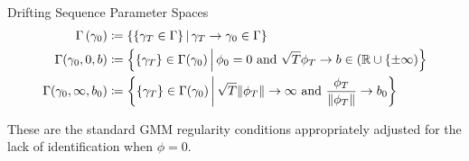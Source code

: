 \documentclass[11pt, letterpaper, twoside, final]{article}
\begin{document}
\begin{appendices}
    \begin{defn}{Drifting Sequence Parameter Spaces}
        \begin{align}
            \Gamma\left(\gamma_0\right) &\coloneqq \left\lbrace \left\lbrace \gamma_T \in \Gamma \right\rbrace
            \mvert \gamma_T \to \gamma_0 \in \Gamma \right\rbrace\\ 
            \Gamma(\gamma_0, 0, b) &\coloneqq \left\lbrace \lbrace \gamma_T \rbrace \in \Gamma(\gamma_0) \mvert
            \phi_0 = 0\ \text{and}\ \sqrt{T} \phi_T \to b \in (\R \cup \lbrace \pm \infty) \right\rbrace \\
            \Gamma(\gamma_0, \infty, b_0) &\coloneqq \left\lbrace \lbrace \gamma_T \rbrace \in \Gamma (\gamma_0)
            \mvert \sqrt{T} \norm{\phi_T} \to \infty\ \text{and}\ \frac{\phi_T}{\norm{\phi_T}} \to b_0
            \right\rbrace 
        \end{align}
    \end{defn}
    
    These are the standard GMM regularity conditions appropriately adjusted for the lack of identification when
    $\phi =0$.
    

\end{appendices}
\end{document}
